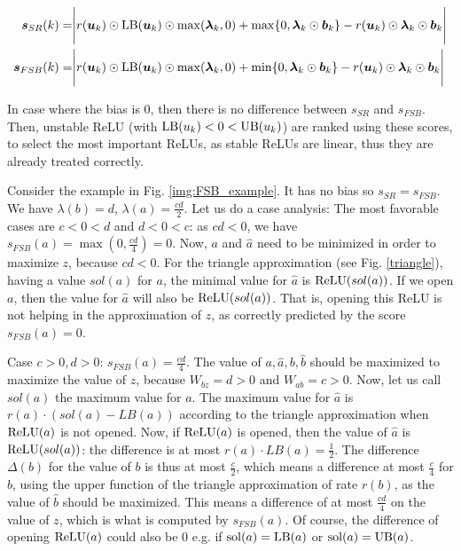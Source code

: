 	\begin{align*}
		\bm{s}_{SR}(k) =& %
		\Biggl\lvert r(\bm{u}_k) \odot \LB(\bm{u}_k) \odot \max(\bm{\lambda}_{k},0)
		+ \max\{0,\bm{\lambda}_{k}\odot\bm{b}_{k}\}-r(\bm{u}_k) \odot\bm{\lambda}_{k}\odot\bm{{b}}_{k}
		\Biggr\rvert  \\
		\bm{s}_{FSB}(k) =& \Biggl\lvert r(\bm{u}_k) \odot \LB(\bm{u}_k) \odot \max(\bm{\lambda}_{k},0)
		+ \min\{0,\bm{\lambda}_{k}\odot\bm{b}_{k}\}-r(\bm{u}_k) \odot\bm{\lambda}_{k}\odot\bm{{b}}_{k}
		\Biggr\rvert
	\end{align*}
	
	In case where the bias is 0, then there is no difference between $s_{SR}$ and $s_{FSB}$.
	Then, unstable ReLU (with $\mathrm{LB}(u_k) < 0 < \mathrm{UB}(u_k)$) are ranked using these scores, to select the most important ReLUs, as stable ReLUs are linear, thus they are already treated correctly.
	


Consider the example in Fig. \ref{img:FSB_example}. It has no bias so $s_{SR}=s_{FSB}$.
We have $\lambda(b)=d$, $\lambda(a)=\frac{cd}{2}$.
Let us do a case analysis:
The most favorable cases are $c < 0 < d$ and $d < 0 < c$: 
as $cd <0$, we have $s_{FSB}(a)=\max(0,\frac{cd}{4}) = 0$.
Now, $a$ and $\hat{a}$ need to be minimized in order to maximize $z$, because $cd <0$. 
For the triangle approximation (see Fig. \ref{triangle}), having a value $sol(a)$ for $a$, the minimal value for $\hat{a}$ is $\mathrm{ReLU}(sol(a))$. If we open $a$, then the value for $\hat{a}$ will also be $\mathrm{ReLU}(sol(a))$. That is, opening this ReLU is not helping in the approximation of $z$, as correctly predicted by the score $s_{FSB}(a)= 0$.






Case $c>0,d>0$: $s_{FSB}(a)=\frac{cd}{4}$.
The value of $a,\hat{a},b,\hat{b}$ should be maximized to maximize the value of $z$, because $W_{bz}=d>0$ and $W_{ab}=c>0$. 
Now, let us call $sol(a)$ the maximum value for $a$.
The maximum value for $\hat{a}$ is $r(a)\cdot (sol(a)-LB(a))$ according to the triangle approximation when $\mathrm{ReLU}(a)$ is not opened. Now, if $\mathrm{ReLU}(a)$ is opened, then 
the value of $\hat{a}$ is $\mathrm{ReLU}(sol(a))$: the difference is at most $r(a) \cdot LB(a) = \frac{1}{2}$. The difference $\Delta(b)$ for the value of $b$ is thus at most $\frac{c}{2}$, which means a difference at most $\frac{c}{4}$ for $\hat{b}$, using the upper function of the triangle approximation of rate $r(b)$, as the value of $\hat{b}$ should be maximized.
This means a difference of at most $\frac{cd}{4}$ on the value of $z$, which is what is computed by $s_{FSB}(a)$. Of course, the difference of opening $\mathrm{ReLU}(a)$ could also be 0 e.g. if $\mathrm{sol}(a)=\mathrm{LB}(a)$ or $\mathrm{sol}(a)=\mathrm{UB}(a)$.

